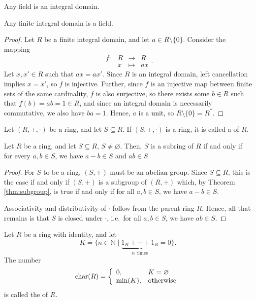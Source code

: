 \begin{cor}
Any field is an integral domain.
\end{cor}

\begin{thm}
Any finite integral domain is a field.
\end{thm}
\begin{proof}
Let $ R $ be a finite integral domain, and let $ a\in R\setminus\{0\} $. Consider the mapping
\begin{equation*}
    \begin{array}{rccc}
        f: & R & \to & R \\
        & x & \mapsto & ax
    \end{array}.
\end{equation*}
Let $ x,x'\in R $ such that $ ax=ax' $. Since $ R $ is an integral domain, left cancellation implies $ x=x' $, so $ f $ is injective. Further, since $ f $ is an injective map between finite sets of the same cardinality, $ f $ is also surjective, so there exists some $ b\in R $ such that $ f(b)=ab=1\in R $, and since an integral domain is necessarily commutative, we also have $ ba=1 $. Hence, $ a $ is a unit, so $ R\setminus\{0\}=R^* $.
\end{proof}

\begin{defn}
Let $ (R,+,\cdot) $ be a ring, and let $ S\subseteq R $. If $ (S,+,\cdot) $ is a ring, it is called a  of $ R $.
\end{defn}

\begin{thm}
Let $ R $ be a ring, and let $ S\subseteq R $, $ S\neq\varnothing $. Then, $ S $ is a subring of $ R $ if and only if for every $ a,b\in S $, we have $ a-b\in S $ and $ ab\in S $.
\end{thm}
\begin{proof}
For $ S $ to be a ring, $ (S,+) $ must be an abelian group. Since $ S\subseteq R $, this is the case if and only if $ (S,+) $ is a subgroup of $ (R,+) $ which, by Theorem \ref{thm:subgroup}, is true if and only if for all $ a,b\in S $, we have $ a-b\in S $.

Associativity and distributivity of $ \cdot $ follow from the parent ring $ R $. Hence, all that remains is that $ S $ is closed under $ \cdot $, i.e.\ for all $ a,b\in S $, we have $ ab\in S $.
\end{proof}

\begin{defn}
Let $ R $ be a ring with identity, and let
\begin{equation*}
    K=\{n\in\mathbb{N}\mid\underbrace{1_R+\cdots+1_R}_{n\text{ times}}=0\}.
\end{equation*}
The number
\begin{equation*}
    \operatorname{char}(R)=
    \left\{\begin{array}{ll}
        0, & K=\varnothing \\
        \min(K), & \text{otherwise}
    \end{array}\right.
\end{equation*}
is called the  of $ R $.
\end{defn}

